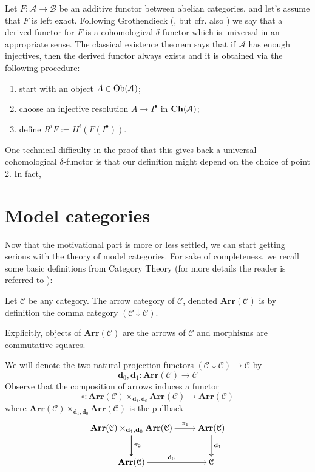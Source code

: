 \begin{refsection}
Let $F \colon \mathcal A \to \mathcal B$ be an additive functor between abelian categories, and let's assume that $F$ is left exact. Following Grothendieck (\cite{tohoku}, but cfr. also \cite[Ch. II]{weibel}) we say that a derived functor for $F$ is a cohomological $\delta$-functor which is universal in an appropriate sense. The classical existence theorem says that if $\mathcal A$ has enough injectives, then the derived functor always exists and it is obtained via the following procedure:
\begin{enumerate}
\item start with an object $A \in \operatorname{Ob}(\mathcal A)$;
\item choose an injective resolution $A \to I^\bullet$ in $\mathbf{Ch}(\mathcal A)$;
\item define $R^i F := H^i(F(I^\bullet))$.
\end{enumerate}
One technical difficulty in the proof that this gives back a universal cohomological $\delta$-functor is that our definition might depend on the choice of point 2. In fact, 

\section{Model categories}

Now that the motivational part is more or less settled, we can start getting serious with the theory of model categories. For sake of completeness, we recall some basic definitions from Category Theory (for more details the reader is referred to \cite{cwm}):

\begin{defin}
Let $\mathcal C$ be any category. The arrow category of $\mathcal C$, denoted $\mathbf{Arr}(\mathcal C)$ is by definition the comma category $(\mathcal C \downarrow \mathcal C)$.
\end{defin}

\begin{rmk}
Explicitly, objects of $\mathbf{Arr}(\mathcal C)$ are the arrows of $\mathcal C$ and morphisms are commutative squares.
\end{rmk}

\begin{rmk}
We will denote the two natural projection functors $(\mathcal C \downarrow \mathcal C) \to \mathcal C$ by
\[
\mathbf d_0, \mathbf d_1 \colon \mathbf{Arr}(\mathcal C) \to \mathcal C
\]
Observe that the composition of arrows induces a functor
\[
\circ \colon \mathbf{Arr}(\mathcal C) \times_{\mathbf d_1, \mathbf d_0} \mathbf{Arr}(\mathcal C) \to \mathbf{Arr}(\mathcal C)
\]
where $\mathbf{Arr}(\mathcal C) \times_{\mathbf d_1, \mathbf d_0} \mathbf{Arr}(\mathcal C)$ is the pullback
\[
\xymatrix{
\mathbf{Arr}(\mathcal C) \times_{\mathbf d_1, \mathbf d_0} \mathbf{Arr}(\mathcal C) \ar[d] \ar[r]^-{\pi_1} \ar[d]^{\pi_2} & \mathbf{Arr}(\mathcal C) \ar[d]^{\mathbf d_1} \\ \mathbf{Arr}(\mathcal C) \ar[r]^{\mathbf d_0} & \mathcal C
}
\]
\end{rmk}


\end{refsection}
